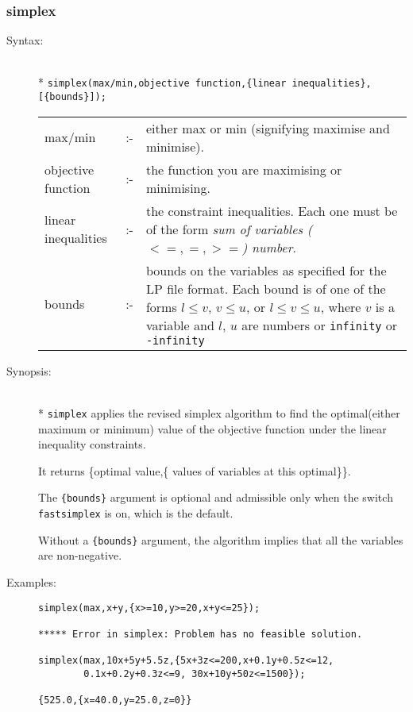 \subsubsection{simplex}
\label{linalg:simplex}

\begin{description}
\item[Syntax:]\mbox{}\\*
\texttt{simplex(max/min,objective function,\{linear 
inequalities\},[\{bounds\}]);}\\[2mm]
\begin{tabular}{l l p{.63\linewidth}} 
  max/min             & :- & either max or min 
    (signifying maximise and minimise). \\
  objective function  & :- & the function you are maximising or 
  minimising. \\
  linear inequalities & :- & the constraint 
    inequalities. Each one must be of the form 
    \textit{sum of variables ($<=,=,>=$) number}.\\
  bounds & :- & bounds on the variables as
    specified for the LP file format. Each bound is of one of the forms $l\leq
    v$, $v\leq u$, or $l\leq v\leq u$, where $v$ is a variable and $l$, $u$ are
    numbers or \texttt{infinity} or \texttt{-infinity}
\end{tabular}

\item[Synopsis:]\mbox{}\\*
\texttt{simplex} applies the revised simplex algorithm to find the 
optimal(either maximum or minimum) value of the objective function 
under the linear inequality constraints.

It returns \{optimal value,\{ values of variables at this optimal\}\}.

The \texttt{\{bounds\}} argument is optional and admissible only when the switch
\texttt{fastsimplex} is on, which is the default.

Without a \texttt{\{bounds\}} argument, the algorithm implies that all the
variables are non-negative.

\item[Examples:]
\begin{verbatim}
simplex(max,x+y,{x>=10,y>=20,x+y<=25});

***** Error in simplex: Problem has no feasible solution.

simplex(max,10x+5y+5.5z,{5x+3z<=200,x+0.1y+0.5z<=12,
        0.1x+0.2y+0.3z<=9, 30x+10y+50z<=1500});

{525.0,{x=40.0,y=25.0,z=0}}
\end{verbatim}
\end{description}



